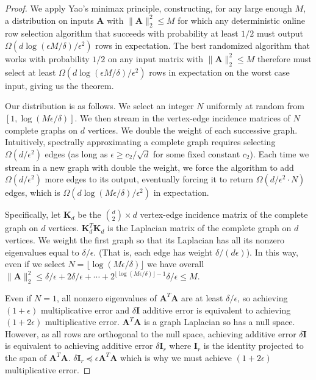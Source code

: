 \documentclass[11pt]{article}
\numberwithin{equation}{section}
\theoremstyle{definition}
\theoremstyle{plain}
\newcommand{\bv}[1]{\mathbf{#1}}
\newcommand{\norm}[1]{\|#1\|}
\begin{document}
\begin{proof}
We apply Yao's minimax principle, constructing, for any large enough $M$, a distribution on inputs $\bv{A}$ with $\norm{\bv{A}}_2^2 \le M$ for which any deterministic online row selection algorithm that succeeds with probability at least $1/2$ must output  $\Omega \left (d\log(\epsilon M/\delta)/\epsilon^2 \right)$ rows in expectation. The best randomized algorithm that works with probability $1/2$ on any input matrix with $\norm{\bv{A}}_2^2 \le M$ therefore must select at least $\Omega \left (d\log(\epsilon M/\delta)/\epsilon^2 \right)$ rows in expectation on the worst case input, giving us the theorem.

Our distribution is as follows. We select an integer $N$ uniformly at random from $[1, \log(M\epsilon/\delta)]$. We then stream in the vertex-edge incidence matrices of $N$ complete graphs on $d$ vertices. We double the weight of each successive graph. Intuitively, spectrally approximating a complete graph requires selecting $\Omega(d/\epsilon^2)$ edges \cite{batson2012twice} (as long as $\epsilon \ge c_2/\sqrt{d}$ for some fixed constant $c_2$). Each time we stream in a new graph with double the weight, we force the algorithm to add $\Omega(d/\epsilon^2)$  more edges to its output, eventually forcing it to return $\Omega(d/\epsilon^2 \cdot N)$ edges, which is $\Omega(d\log(M\epsilon/\delta)/\epsilon^2)$ in expectation.

Specifically, let $\bv{K}_d$ be the $\binom{d}{2} \times d$ vertex-edge incidence matrix of the complete graph on $d$ vertices. $\bv{K}_d^T\bv{K}_d$ is the Laplacian matrix of the complete graph on $d$ vertices. We weight the first graph so that its Laplacian has all its nonzero eigenvalues equal to $\delta/\epsilon$. (That is, each edge has weight $\delta/(d\epsilon)$). In this way, even if we select $N = \lfloor \log(M\epsilon/\delta) \rfloor$ we have overall $\norm{\bv{A}}^2_2 \le \delta/\epsilon + 2\delta/\epsilon + \cdots + 2^{\lfloor \log(M\epsilon/\delta) \rfloor-1} \delta/\epsilon \le M$.

Even if $N = 1$, all nonzero eigenvalues of $\bv{A}^T\bv{A}$ are at least $\delta/\epsilon$, so achieving $(1+\epsilon)$ multiplicative error and $\delta \bv{I}$ additive error is equivalent to achieving $(1+2\epsilon)$ multiplicative error. $\bv{A}^T\bv{A}$ is a graph Laplacian so has a null space. However, as all rows are orthogonal to the null space, achieving additive error $\delta \bv{I}$ is equivalent to achieving additive error $\delta \bv{I}_r$ where $\bv{I}_r$ is the identity projected to the span of $\bv{A}^T\bv{A}$. $\delta \bv{I}_r \preceq \epsilon \bv{A}^T\bv{A}$ which is why we must achieve $(1+2\epsilon)$ multiplicative error.


\end{proof}
\end{document}
